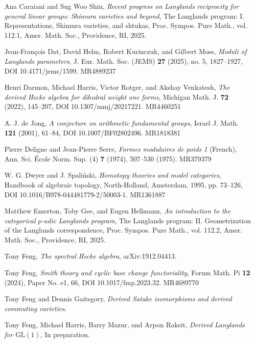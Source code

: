 \begin{refs}
\item[{[CS25]}] Ana Caraiani and Sug Woo Shin, \emph{Recent progress on Langlands reciprocity for general linear groups: Shimura varieties and beyond}, The Langlands program: I. Representations, Shimura varieties, and shtukas, Proc. Sympos. Pure Math., vol. 112.1, Amer. Math. Soc., Providence, RI, 2025.
\item[{[DHKM20]}] Jean-Fran\c{c}ois Dat, David Helm, Robert Kurinczuk, and Gilbert Moss, \emph{Moduli of Langlands parameters}, J. Eur. Math. Soc. (JEMS) \textbf{27} (2025), no. 5, 1827--1927, DOI 10.4171/jems/1599. MR4889237
\item[{[DHRV22]}] Henri Darmon, Michael Harris, Victor Rotger, and Akshay Venkatesh, \emph{The derived Hecke algebra for dihedral weight one forms}, Michigan Math. J. \textbf{72} (2022), 145--207, DOI 10.1307/mmj/20217221. MR4460251
\item[{[dJ01]}] A. J. de Jong, \emph{A conjecture on arithmetic fundamental groups}, Israel J. Math. \textbf{121} (2001), 61--84, DOI 10.1007/BF02802496. MR1818381
\item[{[DS74]}] Pierre Deligne and Jean-Pierre Serre, \emph{Formes modulaires de poids 1} (French), Ann. Sci. \'Ecole Norm. Sup. (4) \textbf{7} (1974), 507--530 (1975). MR379379
\item[{[DS95]}] W. G. Dwyer and J. Spali\'nski, \emph{Homotopy theories and model categories}, Handbook of algebraic topology, North-Holland, Amsterdam, 1995, pp. 73--126, DOI 10.1016/B978-044481779-2/50003-1. MR1361887
\item[{[EGH25]}] Matthew Emerton, Toby Gee, and Eugen Hellmann, \emph{An introduction to the categorical $p$-adic Langlands program}, The Langlands program: II. Geometrization of the Langlands correspondence, Proc. Sympos. Pure Math., vol. 112.2, Amer. Math. Soc., Providence, RI, 2025.
\item[{[Fen20]}] Tony Feng, \emph{The spectral Hecke algebra}, arXiv:1912.04413.
\item[{[Fen24]}] Tony Feng, \emph{Smith theory and cyclic base change functoriality}, Forum Math. Pi \textbf{12} (2024), Paper No. e1, 66, DOI 10.1017/fmp.2023.32. MR4689770
\item[{[FG]}] Tony Feng and Dennis Gaitsgory, \emph{Derived Satake isomorphisms and derived commuting varieties}.
\item[{[FHMR]}] Tony Feng, Michael Harris, Barry Mazur, and Arpon Raksit, \emph{Derived Langlands for $\mathrm{GL}(1)$}, In preparation.


\end{refs}
